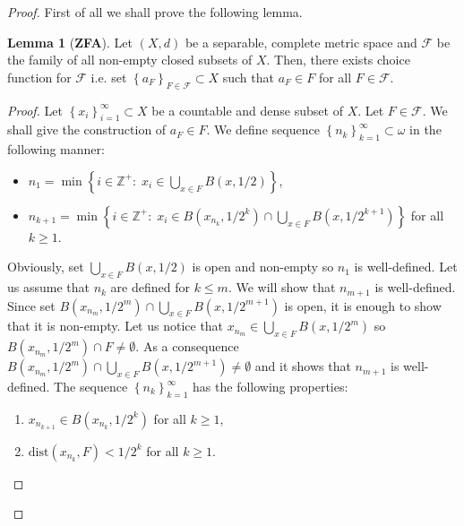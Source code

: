 \documentclass[11pt, reqno]{amsart}
\theoremstyle{definition}
\numberwithin{theorem}{section}
\theoremstyle{definition}
\theoremstyle{definition}
\newtheorem{lemma}[theorem]{Lemma}
\theoremstyle{definition}
\theoremstyle{definition}
\newcommand{\brac}[1]{\left({#1}\right)}
\theoremstyle{definition}
\numberwithin{claim}{section}
\theoremstyle{definition}
\theoremstyle{definition}
\theoremstyle{definition}
\theoremstyle{definition}
\theoremstyle{definition}
\theoremstyle{remboldstyle}
\begin{document}
\begin{proof}

First of all we shall prove the following lemma.
\begin{lemma}[\textbf{ZFA}]\label{choiceclosedcomplete}
Let $(X, d)$ be a separable, complete metric space and $\mathcal{F}$ be the family of all non-empty closed subsets of $X$. Then, there exists choice function for $\mathcal{F}$ i.e. set $\left\{a_F\right\}_{F \in \mathcal{F}} \subset X$ such that $a_F \in F$ for all $F \in \mathcal{F}$.
\end{lemma}

\begin{proof}
Let $\left\{x_i\right\}_{i=1}^\infty \subset X$ be a countable and dense subset of $X$. Let $F \in \mathcal{F}$. We shall give the construction of $a_F \in F$. We define sequence $\left\{n_k\right\}_{k=1}^\infty \subset \omega$ in the following manner: 
\begin{itemize}
\item $n_1 = \min\left\{i \in \mathbb{Z}^+\colon\; x_i \in \bigcup_{x \in F} B\brac{x, 1/2}\right\}$,
\item $n_{k+1} = \min\left\{i \in \mathbb{Z}^+\colon\; x_i \in B\brac{x_{n_k}, 1/2^k} \cap \bigcup_{x \in F} B(x, 1/2^{k+1})\right\}$ for all $k \ge 1$.
\end{itemize}

Obviously, set $\bigcup_{x \in F} B\brac{x, 1/2}$ is open and non-empty so $n_1$ is well-defined. Let us assume that $n_k$ are defined for $k \le m$. We will show that $n_{m+1}$ is well-defined. Since set $B\brac{x_{n_m}, 1/2^m} \cap \bigcup_{x \in F} B(x, 1/2^{m+1})$ is open, it is enough to show that it is non-empty. Let us notice that $x_{n_m} \in \bigcup_{x \in F} B\brac{x, 1/2^m}$ so $B\brac{x_{n_m}, 1/2^m} \cap F \neq \emptyset$. As a consequence $B\brac{x_{n_m}, 1/2^m} \cap \bigcup_{x \in F} B(x, 1/2^{m+1}) \neq \emptyset$ and it shows that $n_{m+1}$ is well-defined.
The sequence $\left\{n_k\right\}_{k=1}^\infty$ has the following properties:
\begin{enumerate}
\item[(1)] $x_{n_{k+1}} \in B\brac{x_{n_k}, 1/2^{k}}$ for all $k \ge 1$,
\item[(2)] $\text{dist}\brac{x_{n_k}, F} < 1/2^k$ for all $k \ge 1$.
\end{enumerate}


\end{proof}
\end{proof}
\end{document}
